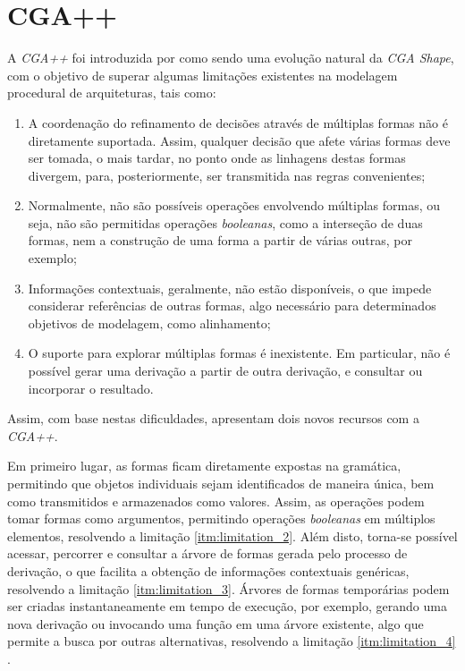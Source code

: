 \section{CGA++}
\label{sec:cga++}

A \textit{CGA++} foi introduzida por  como sendo uma evolução natural da \textit{CGA Shape}, com o objetivo de superar algumas limitações existentes na modelagem procedural de arquiteturas, tais como:

\vspace{0.5cm}

\begin{enumerate}
    \item \label{itm:limitation_1} A coordenação do refinamento de decisões através de múltiplas formas não é diretamente suportada. Assim, qualquer decisão que afete várias formas deve ser tomada, o mais tardar, no ponto onde as linhagens destas formas divergem, para, posteriormente, ser transmitida nas regras convenientes;

    \item \label{itm:limitation_2} Normalmente, não são possíveis operações envolvendo múltiplas formas, ou seja, não são permitidas operações \textit{booleanas}, como a interseção de duas formas, nem a construção de uma forma a partir de várias outras, por exemplo;

    \item \label{itm:limitation_3} Informações contextuais, geralmente, não estão disponíveis, o que impede considerar referências de outras formas, algo necessário para determinados objetivos de modelagem, como alinhamento;

    \item \label{itm:limitation_4} O suporte para explorar múltiplas formas é inexistente. Em particular, não é possível gerar uma derivação a partir de outra derivação, e consultar ou incorporar o resultado.
\end{enumerate}

\vspace{0.5cm}

Assim, com base nestas dificuldades,  apresentam dois novos recursos com a \textit{CGA++}.

Em primeiro lugar, as formas ficam diretamente expostas na gramática, permitindo que objetos individuais sejam identificados de maneira única, bem como transmitidos e armazenados como valores. Assim, as operações podem tomar formas como argumentos, permitindo operações \textit{booleanas} em múltiplos elementos, resolvendo a limitação \ref{itm:limitation_2}. Além disto, torna-se possível acessar, percorrer e consultar a árvore de formas gerada pelo processo de derivação, o que facilita a obtenção de informações contextuais genéricas, resolvendo a limitação \ref{itm:limitation_3}. Árvores de formas temporárias podem ser criadas instantaneamente em tempo de execução, por exemplo, gerando uma nova derivação ou invocando uma função em uma árvore existente, algo que permite a busca por outras alternativas, resolvendo a limitação \ref{itm:limitation_4} \cite{schwarz2015}. 


